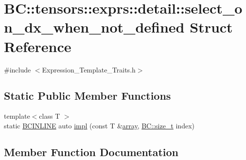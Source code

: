 \hypertarget{structBC_1_1tensors_1_1exprs_1_1detail_1_1select__on__dx__when__not__defined}{}\section{BC\+:\+:tensors\+:\+:exprs\+:\+:detail\+:\+:select\+\_\+on\+\_\+dx\+\_\+when\+\_\+not\+\_\+defined Struct Reference}
\label{structBC_1_1tensors_1_1exprs_1_1detail_1_1select__on__dx__when__not__defined}


{\ttfamily \#include $<$Expression\+\_\+\+Template\+\_\+\+Traits.\+h$>$}

\subsection*{Static Public Member Functions}
\begin{DoxyCompactItemize}
\item 
{\footnotesize template$<$class T $>$ }\\static \hyperlink{BlackCat__Common_8h_a6699e8b0449da5c0fafb878e59c1d4b1}{B\+C\+I\+N\+L\+I\+NE} auto \hyperlink{structBC_1_1tensors_1_1exprs_1_1detail_1_1select__on__dx__when__not__defined_ae025b873019bd59ad3d57873655a3388}{impl} (const T \&\hyperlink{structBC_1_1array}{array}, \hyperlink{namespaceBC_a6007cbc4eeec401a037b558910a56173}{B\+C\+::size\+\_\+t} index)
\end{DoxyCompactItemize}


\subsection{Member Function Documentation}
